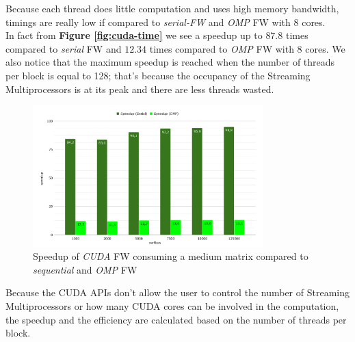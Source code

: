 Because each thread does little computation and uses high memory bandwidth, timings are really low if compared
to \emph{serial-FW} and \emph{OMP} FW with 8 cores. \\
In fact from \textbf{Figure \ref*{fig:cuda-time}} we see a speedup up to $87.8$ times compared to \emph{serial} FW
and $12.34$ times compared to \emph{OMP} FW with 8 cores. We also notice that the maximum speedup is reached when the number of threads per block is equal to 128;
that's because the occupancy of the Streaming Multiprocessors is at its peak and there are less threads wasted.
\begin{figure}[h!]
\centering                                                                        
\includegraphics[width=3.5in]{diagrams/cuda-speedup}
\captionsetup{justification=centering}                                                                                                                                   
\caption{Speedup of \emph{CUDA} FW consuming a medium matrix compared to \emph{sequential} and \emph{OMP} FW}                                                                                                                                            
\label{fig:cuda-speedup}                                                                                                                                                           
\end{figure}

Because the CUDA APIs don't allow the user to control the number of Streaming Multiprocessors or how many CUDA cores
can be involved in the computation, the speedup and the efficiency are calculated based on the number of threads per block.


